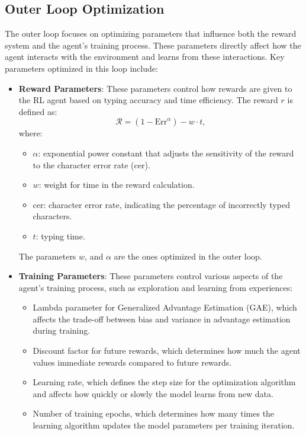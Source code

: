 \subsection{Outer Loop Optimization}
The outer loop focuses on optimizing parameters that influence both the reward system and the agent's training process. These parameters directly affect how the agent interacts with the environment and learns from these interactions. Key parameters optimized in this loop include:
    \begin{itemize}
        \item \textbf{Reward Parameters}: These parameters control how rewards are given to the RL agent based on typing accuracy and time efficiency. The reward $r$ is defined as:
        \begin{equation}
        \mathcal{R} = (1 - \text{Err}^{\alpha}) - w \cdot t,
        \end{equation}
        where:
        \begin{itemize}
            \item $\alpha$: exponential power constant that adjusts the sensitivity of the reward to the character error rate (cer).
            \item $w$: weight for time in the reward calculation.
            \item cer: character error rate, indicating the percentage of incorrectly typed characters.
            \item $t$: typing time.
        \end{itemize}
        The parameters $w$, and $\alpha$ are the ones optimized in the outer loop.
        \item \textbf{Training Parameters}: These parameters control various aspects of the agent's training process, such as exploration and learning from experiences:
        \begin{itemize}
            \item Lambda parameter for Generalized Advantage Estimation (GAE), which affects the trade-off between bias and variance in advantage estimation during training.
            \item Discount factor for future rewards, which determines how much the agent values immediate rewards compared to future rewards.
            \item Learning rate, which defines the step size for the optimization algorithm and affects how quickly or slowly the model learns from new data.
            \item Number of training epochs, which determines how many times the learning algorithm updates the model parameters per training iteration.

\end{itemize}
\end{itemize}
